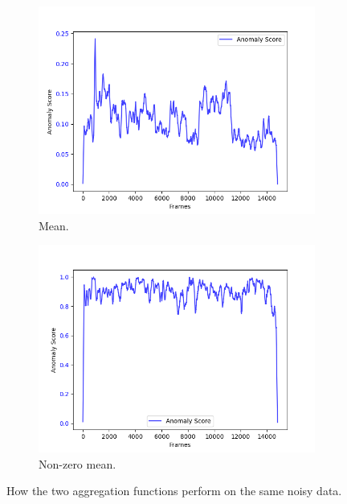 \begin{figure}[H]
    \centering
    \begin{subfigure}[t]{0.5\textwidth}
        \centering
        \includegraphics[width=\textwidth]{resources/methodology/aggr_noisy_mean.png}
        \caption{Mean.}
    \end{subfigure}%
    \begin{subfigure}[t]{0.5\textwidth}
        \centering
        \includegraphics[width=\textwidth]{resources/methodology/aggr_noisy_nzmean.png}
        \caption{Non-zero mean.}
    \end{subfigure}
    \caption[Aggregation Functions on Noise Data]{How the two aggregation functions perform on the same noisy data.}
    \label{fig:aggr_noisy}
\end{figure}
